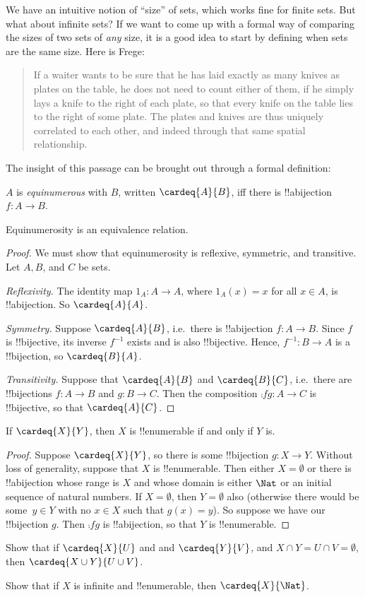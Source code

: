\documentclass[../../../include/open-logic-section]{subfiles}
\begin{document}

We have an intuitive notion of ``size'' of sets, which works fine for
finite sets. But what about infinite sets? If we want to come up with
a formal way of comparing the sizes of two sets of \emph{any} size, it
is a good idea to start by defining when sets are the same size. Here is Frege:
\begin{quote}
	If a waiter wants to be sure that he has laid exactly as many knives as plates on the table, he does not need to count either of them, if he simply lays a knife to the right of each plate, so that every knife on the table lies to the right of some plate. The plates and knives are thus uniquely correlated to each other, and indeed through that same spatial relationship. \citep[\S70]{Frege1884}
\end{quote}
The insight of this passage can be brought out through a formal definition:
\begin{defn}$A$ is \emph{equinumerous} with $B$, written $\cardeq{A}{B}$, iff there is !!a{bijection} $f \colon A \to B$. 
\end{defn}
\begin{prop}
Equinumerosity is an equivalence relation.
\end{prop}
\begin{proof} We must show that equinumerosity is reflexive, symmetric, and transitive. Let $A, B$, and $C$ be sets.

\emph{Reflexivity.} The identity map $1_A \colon A \to A$, where
  $1_A (x) = x$ for all $x \in A$, is !!a{bijection}. So $\cardeq{A}{A}$.

\emph{Symmetry.} Suppose $\cardeq{A}{B}$, i.e.\ there
  is !!a{bijection} $f\colon A \to B$. Since $f$ is
  !!{bijective}, its inverse $f^{-1}$ exists and is also
  !!{bijective}. Hence, $f^{-1}\colon B \to A$ is a !!{bijection}, so $\cardeq{B}{A}$.

\emph{Transitivity.} Suppose that $\cardeq{A}{B}$ and $\cardeq{B}{C}$, i.e.\ there are !!{bijection}s $f\colon A \to B$ and $g\colon B \to
  C$. Then the composition $\comp{f}{g}\colon A \to C$ is
  !!{bijective}, so that $\cardeq{A}{C}$.
\end{proof}
\begin{prop}
If $\cardeq{X}{Y}$, then $X$ is !!{enumerable} if
and only if $Y$ is.
\end{prop}
\begin{proof}
Suppose $\cardeq{X}{Y}$, so there is some !!{bijection} $g \colon X \to Y$. Without loss of generality, suppose that $X$ is
!!{enumerable}. Then either $X  = \emptyset$ or there is
!!a{bijection} whose range is $X$ and whose domain is either $\Nat$ or an initial sequence of natural numbers. If $X =
\emptyset$, then $Y = \emptyset$ also (otherwise there would be
some~$y \in Y$ with no $x \in X$ such that $g(x) = y$).  So suppose we have our !!{bijection} $g$. Then $\comp{f}{g}$ is !!a{bijection}, so that $Y$ is !!{enumerable}.
\end{proof}

\begin{prob}
Show that if $\cardeq{X}{U}$ and and $\cardeq{Y}{V}$, and $X \cap Y = U \cap V = \emptyset$,
then $\cardeq{X \cup Y}{U \cup V}$.
\end{prob}

\begin{prob}
Show that if $X$ is infinite and !!{enumerable}, then $\cardeq{X}{\Nat}$.
\end{prob}
\end{document}
